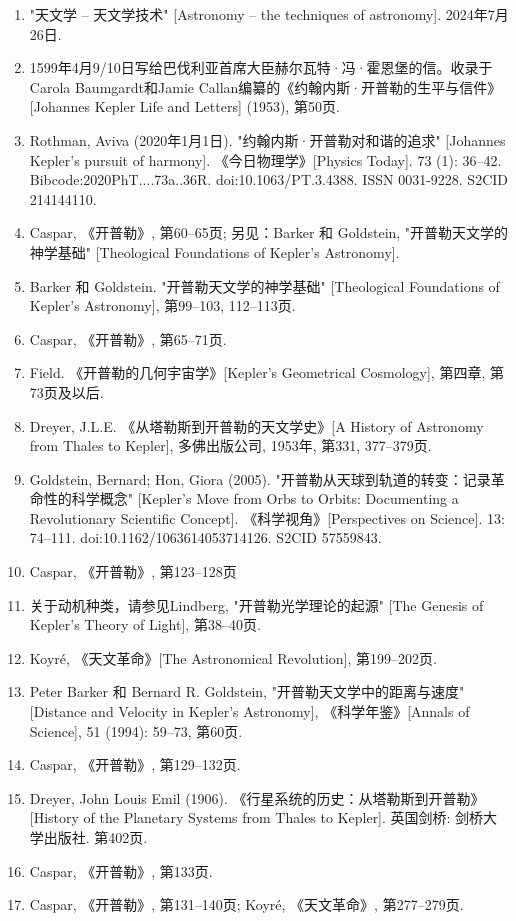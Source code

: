\begin{enumerate}
\item "天文学 – 天文学技术" [Astronomy – the techniques of astronomy]. 2024年7月26日.
\item 1599年4月9/10日写给巴伐利亚首席大臣赫尔瓦特·冯·霍恩堡的信。收录于Carola Baumgardt和Jamie Callan编纂的《约翰内斯·开普勒的生平与信件》[Johannes Kepler Life and Letters] (1953), 第50页.
\item Rothman, Aviva (2020年1月1日). "约翰内斯·开普勒对和谐的追求" [Johannes Kepler's pursuit of harmony]. 《今日物理学》[Physics Today]. 73 (1): 36–42. Bibcode:2020PhT....73a..36R. doi:10.1063/PT.3.4388. ISSN 0031-9228. S2CID 214144110.
\item Caspar, 《开普勒》, 第60–65页; 另见：Barker 和 Goldstein, "开普勒天文学的神学基础" [Theological Foundations of Kepler's Astronomy].
\item Barker 和 Goldstein. "开普勒天文学的神学基础" [Theological Foundations of Kepler's Astronomy], 第99–103, 112–113页.
\item Caspar, 《开普勒》, 第65–71页.
\item Field. 《开普勒的几何宇宙学》[Kepler's Geometrical Cosmology], 第四章, 第73页及以后.
\item Dreyer, J.L.E. 《从塔勒斯到开普勒的天文学史》[A History of Astronomy from Thales to Kepler], 多佛出版公司, 1953年, 第331, 377–379页.
\item Goldstein, Bernard; Hon, Giora (2005). "开普勒从天球到轨道的转变：记录革命性的科学概念" [Kepler's Move from Orbs to Orbits: Documenting a Revolutionary Scientific Concept]. 《科学视角》[Perspectives on Science]. 13: 74–111. doi:10.1162/1063614053714126. S2CID 57559843.
\item Caspar, 《开普勒》, 第123–128页
\item 关于动机种类，请参见Lindberg, "开普勒光学理论的起源" [The Genesis of Kepler's Theory of Light], 第38–40页.
\item Koyré, 《天文革命》[The Astronomical Revolution], 第199–202页.
\item Peter Barker 和 Bernard R. Goldstein, "开普勒天文学中的距离与速度" [Distance and Velocity in Kepler's Astronomy], 《科学年鉴》[Annals of Science], 51 (1994): 59–73, 第60页.
\item Caspar, 《开普勒》, 第129–132页.
\item Dreyer, John Louis Emil (1906). 《行星系统的历史：从塔勒斯到开普勒》[History of the Planetary Systems from Thales to Kepler]. 英国剑桥: 剑桥大学出版社. 第402页.
\item Caspar, 《开普勒》, 第133页.
\item Caspar, 《开普勒》, 第131–140页; Koyré, 《天文革命》, 第277–279页.

\end{enumerate}
